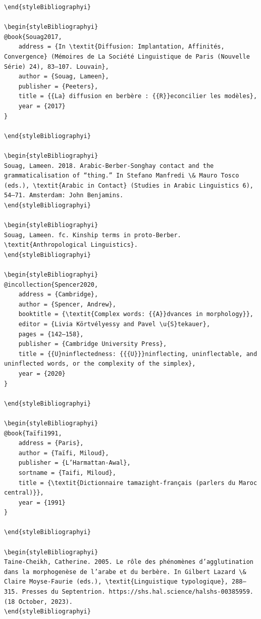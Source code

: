 \documentclass[output=paper]{langscibook}
\begin{document}
\begin{verbatim}
\end{styleBibliographyi}

\begin{styleBibliographyi}
@book{Souag2017,
	address = {In \textit{Diffusion: Implantation, Affinités, Convergence} (Mémoires de La Société Linguistique de Paris (Nouvelle Série) 24), 83–107. Louvain},
	author = {Souag, Lameen},
	publisher = {Peeters},
	title = {{La} diffusion en berbère : {{R}}econcilier les modèles},
	year = {2017}
}

\end{styleBibliographyi}

\begin{styleBibliographyi}
Souag, Lameen. 2018. Arabic-Berber-Songhay contact and the grammaticalisation of “thing.” In Stefano Manfredi \& Mauro Tosco (eds.), \textit{Arabic in Contact} (Studies in Arabic Linguistics 6), 54–71. Amsterdam: John Benjamins.
\end{styleBibliographyi}

\begin{styleBibliographyi}
Souag, Lameen. fc. Kinship terms in proto-Berber. \textit{Anthropological Linguistics}.
\end{styleBibliographyi}

\begin{styleBibliographyi}
@incollection{Spencer2020,
	address = {Cambridge},
	author = {Spencer, Andrew},
	booktitle = {\textit{Complex words: {{A}}dvances in morphology}},
	editor = {Livia Körtvélyessy and Pavel \u{S}tekauer},
	pages = {142–158},
	publisher = {Cambridge University Press},
	title = {{U}ninflectedness: {{{U}}}ninflecting, uninflectable, and uninflected words, or the complexity of the simplex},
	year = {2020}
}

\end{styleBibliographyi}

\begin{styleBibliographyi}
@book{Taïfi1991,
	address = {Paris},
	author = {Taïfi, Miloud},
	publisher = {L’Harmattan-Awal},
	sortname = {Taifi, Miloud},
	title = {\textit{Dictionnaire tamazight-français (parlers du Maroc central)}},
	year = {1991}
}

\end{styleBibliographyi}

\begin{styleBibliographyi}
Taine-Cheikh, Catherine. 2005. Le rôle des phénomènes d’agglutination dans la morphogenèse de l’arabe et du berbère. In Gilbert Lazard \& Claire Moyse-Faurie (eds.), \textit{Linguistique typologique}, 288–315. Presses du Septentrion. https://shs.hal.science/halshs-00385959. (18 October, 2023).
\end{styleBibliographyi}


\end{verbatim}
\end{document}
